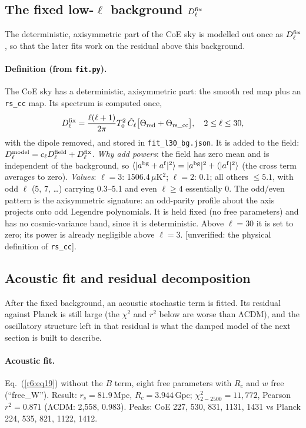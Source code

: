 \documentclass[11pt]{article}
\newcommand{\flag}[1]{\textsf{[unverified: #1]}}
\begin{document}
\subsection{The fixed low-$\ell$ background $D^{\rm fix}_\ell$}
The deterministic, axisymmetric part of the CoE sky is modelled out once as $D^{\rm fix}_\ell$, so that the later fits work on the residual above this background.

\paragraph{Definition (from \texttt{fit.py}).} The CoE sky has a deterministic, axisymmetric part: the smooth red map plus an \texttt{rs\_cc} map. Its spectrum is computed once,
\begin{equation}\label{r6:eq21}
D^{\rm fix}_\ell=\frac{\ell(\ell+1)}{2\pi}T_0^2\,\hat C_\ell\big[\Theta_{\rm red}+\Theta_{\rm rs\_cc}\big],\quad 2\le\ell\le30,
\end{equation}
with the dipole removed, and stored in \texttt{fit\_l30\_bg.json}. It is added to the field: $D^{\rm model}_\ell=c_\ell D^{\rm field}_\ell+D^{\rm fix}_\ell$. \emph{Why add powers}: the field has zero mean and is independent of the background, so $\langle|a^{\rm bg}+a^{\rm f}|^2\rangle=|a^{\rm bg}|^2+\langle|a^{\rm f}|^2\rangle$ (the cross term averages to zero). \emph{Values}: $\ell=3$: 1506.4\,$\mu$K$^2$; $\ell=2$: 0.1; all others $\le5.1$, with odd $\ell$ (5, 7, \ldots) carrying 0.3--5.1 and even $\ell\ge4$ essentially 0. The odd/even pattern is the axisymmetric signature: an odd-parity profile about the axis projects onto odd Legendre polynomials. It is held fixed (no free parameters) and has no cosmic-variance band, since it is deterministic. Above $\ell=30$ it is set to zero; its power is already negligible above $\ell=3$. \flag{the physical definition of \texttt{rs\_cc}}.

\subsection{Acoustic fit and residual decomposition}
After the fixed background, an acoustic stochastic term is fitted. Its residual against Planck is still large (the $\chi^2$ and $r^2$ below are worse than ΛCDM), and the oscillatory structure left in that residual is what the damped model of the next section is built to describe.

\paragraph{Acoustic fit.} Eq.~(\ref{r6:eq19}) without the $B$ term, eight free parameters with $R_c$ and $w$ free (``free\_W''). Result: $r_s=81.9$\,Mpc, $R_c=3.944$\,Gpc; $\chi^2_{2-2500}=11{,}772$, Pearson $r^2=0.871$ (ΛCDM: 2{,}558, 0.983). Peaks: CoE 227, 530, 831, 1131, 1431 vs Planck 224, 535, 821, 1122, 1412.
\end{document}
